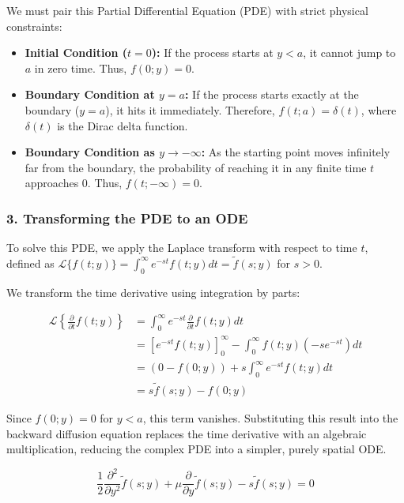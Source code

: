 \documentclass{beamer}
\begin{document}
\begin{frame}
We must pair this Partial Differential Equation (PDE) with strict physical constraints:

\begin{itemize}
  \item \textbf{Initial Condition ($t = 0$):} If the process starts at $y < a$, it cannot jump to $a$ in zero time. Thus, $f(0; y) = 0$.
  \item \textbf{Boundary Condition at $y = a$:} If the process starts exactly at the boundary ($y = a$), it hits it immediately. Therefore, $f(t; a) = \delta(t)$, where $\delta(t)$ is the Dirac delta function.
  \item \textbf{Boundary Condition as $y \rightarrow -\infty$:} As the starting point moves infinitely far from the boundary, the probability of reaching it in any finite time $t$ approaches $0$. Thus, $f(t; -\infty) = 0$.
\end{itemize}
\end{frame}

\begin{frame}
\frametitle{3. Transforming the PDE to an ODE}
To solve this PDE, we apply the Laplace transform with respect to time $t$, defined as $\mathcal{L}\{f(t; y)\} = \int_0^\infty e^{-st} f(t; y) dt = \tilde{f}(s; y)$ for $s > 0$.

We transform the time derivative using integration by parts:

\[
\begin{aligned}
\mathcal{L} \left\{ \frac{\partial}{\partial t} f(t;y) \right\} &= \int_{0}^{\infty} e^{-st} \frac{\partial}{\partial t} f(t;y) dt \\
&= \left[ e^{-st} f(t;y) \right]_{0}^{\infty} - \int_{0}^{\infty} f(t;y) (-s e^{-st}) dt \\
&= (0 - f(0;y)) + s \int_{0}^{\infty} e^{-st} f(t;y) dt \\
&= s\tilde{f}(s;y) - f(0;y)
\end{aligned}
\]
\end{frame}

\begin{frame}
Since $f(0; y) = 0$ for $y < a$, this term vanishes. Substituting this result into the backward diffusion equation replaces the time derivative with an algebraic multiplication, reducing the complex PDE into a simpler, purely spatial ODE.

\[
\frac{1}{2} \frac{\partial^2}{\partial y^2} \tilde{f}(s;y) + \mu \frac{\partial}{\partial y} \tilde{f}(s;y) - s\tilde{f}(s;y) = 0
\]
\end{frame}
\end{document}
